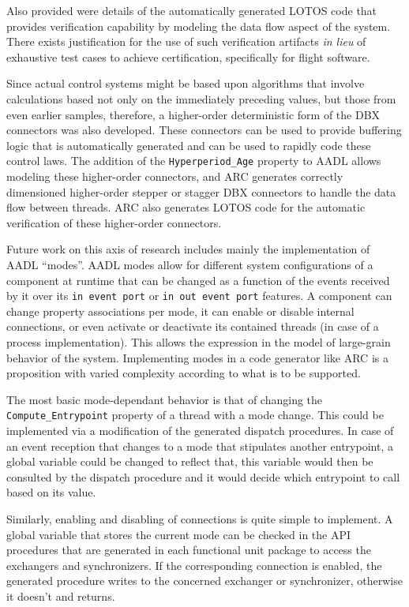 Also provided were details of the automatically generated LOTOS code
that provides verification capability by modeling the data flow aspect
of the system. There exists justification for the use of such
verification artifacts \emph{in lieu} of exhaustive test cases to
achieve certification, specifically for flight software.

Since actual control systems might be based upon algorithms that
involve calculations based not only on the immediately preceding
values, but those from even earlier samples, therefore, a higher-order
deterministic form of the DBX connectors was also developed. These
connectors can be used to provide buffering logic that is
automatically generated and can be used to rapidly code these control
laws. The addition of the \texttt{Hyperperiod\_Age} property to AADL
allows modeling these higher-order connectors, and ARC generates
correctly dimensioned higher-order stepper or stagger DBX connectors
to handle the data flow between threads. ARC also generates LOTOS code
for the automatic verification of these higher-order connectors.

Future work on this axis of research includes mainly the
implementation of AADL ``modes''. AADL modes allow for different
system configurations of a component at runtime that can be changed as
a function of the events received by it over its \texttt{in event port}
or \texttt{in out event port} features. A component can change
property associations per mode, it can enable or disable internal
connections, or even activate or deactivate its contained threads (in
case of a process implementation). This allows the expression in the
model of large-grain behavior of the system. Implementing modes in
a code generator like ARC is a proposition with varied complexity
according to what is to be supported.

The most basic mode-dependant behavior is that of changing the
\texttt{Compute\_Entrypoint} property of a thread with a mode
change. This could be implemented via a modification of the generated
dispatch procedures. In case of an event reception that changes to a
mode that stipulates another entrypoint, a global variable could be
changed to reflect that, this variable would then be consulted by the
dispatch procedure and it would decide which entrypoint to call based
on its value.

Similarly, enabling and disabling of connections is quite simple to
implement. A global variable that stores the current mode can be
checked in the API procedures that are generated in each functional
unit package to access the exchangers and synchronizers. If the
corresponding connection is enabled, the generated procedure writes to
the concerned exchanger or synchronizer, otherwise it doesn't and
returns.

